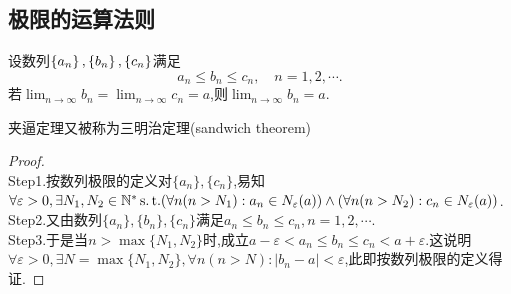 \subsection{极限的运算法则}
\begin{theorem}[夹逼定理]\label{sandwich theorem}
    设数列$\left\{a_n\right\},\left\{b_n\right\},\left\{c_n\right\}$满足
    \[a_n\leqslant b_n\leqslant c_n,\quad n=1,2,\cdots.\]
    若$\lim_{n\to\infty}b_n=\lim_{n\to\infty}c_n=a$,则$\lim_{n\to\infty}b_n=a.$
\end{theorem}

\begin{remark}
    夹逼定理又被称为三明治定理(sandwich theorem)
\end{remark}

\begin{proof}
    \\Step1.按数列极限的定义对$\{a_n\},\{c_n\}$,易知$\forall \varepsilon >0,\exists N_1,N_2\in\mathbb{N}^{*}\operatorname{s.t.}
    (\forall n(n>N_1):a_n\in N_\varepsilon(a))\land(\forall n(n>N_2):c_n\in N_\varepsilon(a))$.\\
    Step2.又由数列$\{a_n\},\{b_n\},\{c_n\}$满足$a_n\leqslant b_n \leqslant c_n,n=1,2,\cdots$.\\
    Step3.于是当$n>\max\{N_1,N_2\}$时,成立$a-\varepsilon <a_n\leqslant b_n\leqslant c_n < a +\varepsilon$.这说明$\forall\varepsilon >0,\exists N=\max\{N_1,N_2\},\forall n(n>N):|b_n-a|<\varepsilon$,此即按数列极限的定义得证.

\end{proof}